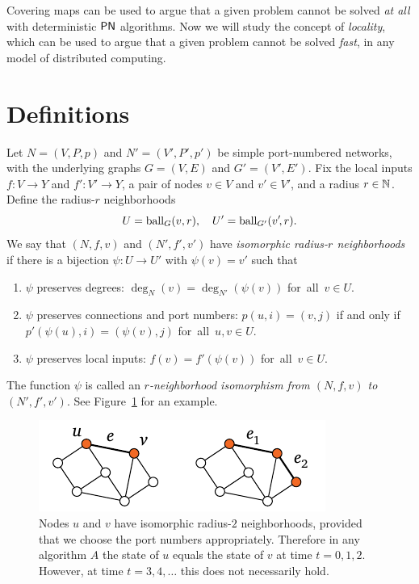 

\noindent
Covering maps can be used to argue that a given problem cannot be solved \emph{at all} with deterministic $\textup{\sffamily PN}$ algorithms. Now we will study the concept of \emph{locality}, which can be used to argue that a given problem cannot be solved \emph{fast}, in any model of distributed computing.

\section{Definitions}

Let $N = (V,P,p)$ and $N' = (V'\!,P'\!,p')$ be simple port-numbered networks, with the underlying graphs $G = (V,E)$ and $G' = (V'\!,E')$. Fix the local inputs $f\colon V \to Y$ and $f'\colon V' \to Y$, a pair of nodes $v \in V$ and $v' \in V'$, and a radius $r \in \mathbb{N}$. Define the radius-$r$ neighborhoods
\[
    U = \operatorname{ball}_G(v,r), \quad U' = \operatorname{ball}_{G'}(v'\!,r).
\]
We say that $(N,f,v)$ and $(N'\!,f'\!,v')$ have \emph{isomorphic radius-$r$ neighborhoods} if there is a bijection $\psi \colon U \to U'$ with $\psi(v) = v'$ such that
\begin{enumerate}\raggedright
    \item $\psi$ preserves degrees: $\deg_{N}(v) = \deg_{N'}(\psi(v))$ for~all~$v \in U$.
    \item $\psi$ preserves connections and port numbers: $p(u,i) = (v,j)$ if and only if $p'(\psi(u),i) = (\psi(v),j)$ for~all~$u, v \in U$.
    \item $\psi$ preserves local inputs: $f(v) = f'(\psi(v))$ for~all~$v \in U$.
\end{enumerate}
The function $\psi$ is called an \emph{$r$-neighborhood isomorphism from $(N,f,v)$ to $(N'\!,f'\!,v')$}. See Figure~\ref{fig:same-neigh} for an example.

\begin{figure}
    \centering
    \includegraphics[page=\PSameNeigh]{figs.pdf}
    \caption{Nodes $u$ and $v$ have isomorphic radius-$2$ neighborhoods, provided that we choose the port numbers appropriately. Therefore in any algorithm $A$ the state of $u$ equals the state of $v$ at time $t = 0,1,2$. However, at time $t = 3, 4, \dotsc$ this does not necessarily hold.}\label{fig:same-neigh}
\end{figure}

